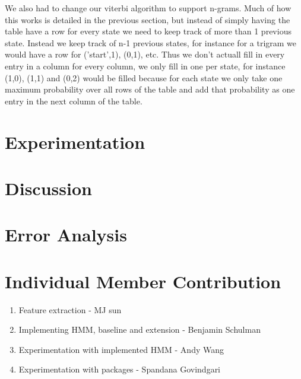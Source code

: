 \documentclass{article}
\begin{document}
We also had to change our viterbi algorithm to support n-grams. Much of how this works is detailed in the previous section, but instead of simply having the table have a row for every state we need to keep track of more than 1 previous state. Instead we keep track of n-1 previous states, for instance for a trigram we would have a row for ('start',1), (0,1), etc. Thus we don't actuall fill in every entry in a column for every column, we only fill in one per state, for instance (1,0), (1,1) and (0,2) would be filled because for each state we only take one maximum probability over all rows of the table and add that probability as one entry in the next column of the table. 


\section{Experimentation}
\section{Discussion}
\section{Error Analysis}

\section{Individual Member Contribution}
\begin{enumerate}
\item Feature extraction - MJ sun
\item Implementing HMM, baseline and extension - Benjamin Schulman
\item Experimentation with implemented HMM - Andy Wang
\item Experimentation with packages - Spandana Govindgari
\end{enumerate}
\end{document}
